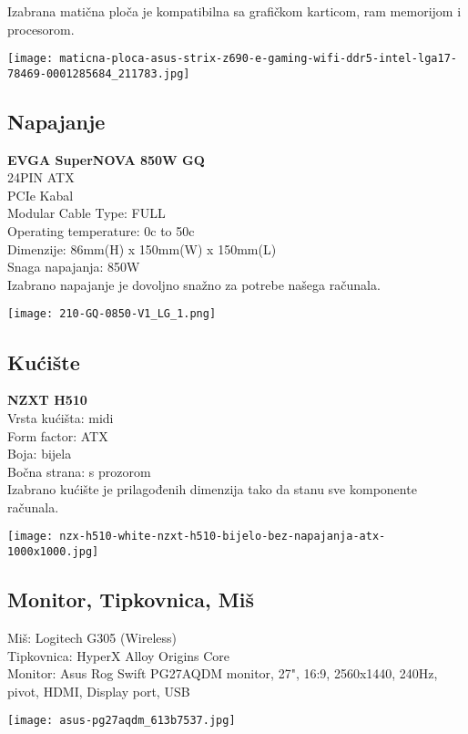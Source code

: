 \documentclass{article}
\begin{document}
Izabrana matična ploča je kompatibilna sa grafičkom karticom, ram memorijom i procesorom.

\begin{center}
    \texttt{[image: maticna-ploca-asus-strix-z690-e-gaming-wifi-ddr5-intel-lga17-78469-0001285684\_211783.jpg]}
\end{center}



\subsection{Napajanje}
\textbf{EVGA SuperNOVA 850W GQ}\\
24PIN ATX\\
PCIe Kabal\\
Modular Cable Type: FULL\\
Operating temperature: 0c to 50c\\
Dimenzije: 86mm(H) x 150mm(W) x 150mm(L)\\
Snaga napajanja: 850W\\

Izabrano napajanje je dovoljno snažno za potrebe našega računala.

\begin{center}
    \texttt{[image: 210-GQ-0850-V1\_LG\_1.png]}
\end{center}


\subsection{Kućište}
\textbf{NZXT H510}\\
Vrsta kućišta: midi\\
Form factor: ATX\\
Boja: bijela\\
Bočna strana: s prozorom\\

Izabrano kućište je prilagođenih dimenzija tako da stanu sve komponente računala.

\begin{center}
    \texttt{[image: nzx-h510-white-nzxt-h510-bijelo-bez-napajanja-atx-1000x1000.jpg]}
\end{center}


\subsection{Monitor, Tipkovnica, Miš}
Miš: Logitech G305 (Wireless)\\
Tipkovnica: HyperX Alloy Origins Core\\
Monitor: Asus Rog Swift PG27AQDM monitor, 27", 16:9, 2560x1440, 240Hz, pivot, HDMI, Display port, USB\\
\begin{center}
    \texttt{[image: asus-pg27aqdm\_613b7537.jpg]}
\end{center}
\end{document}
